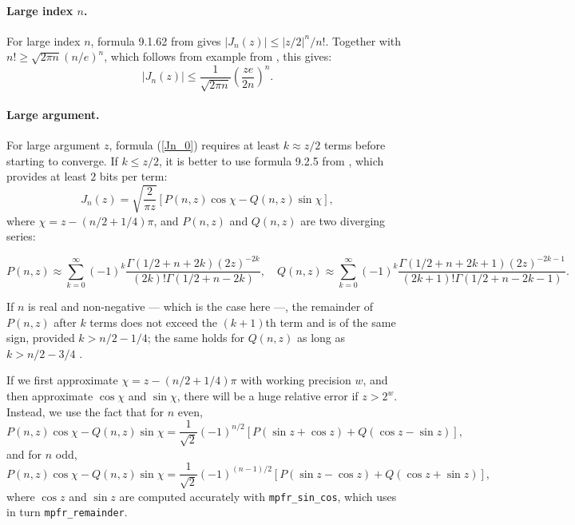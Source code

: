 \documentclass[12pt]{amsart}
\begin{document}
\paragraph{Large index $n$.}
For large index $n$, formula 9.1.62 from \cite{AbSt73} gives
$|J_n(z)| \leq |z/2|^n/n!$.
Together with $n! \geq \sqrt{2 \pi n} (n/e)^n$, which follows from example
from \cite[Eq.~6.1.38]{AbSt73}, this gives:
\[ |J_n(z)| \leq \frac{1}{\sqrt{2 \pi n}} \left( \frac{ze}{2n} \right)^n. \]

\paragraph{Large argument.}

For large argument $z$, formula (\ref{Jn_0}) requires at least
$k \approx z/2$ terms before starting to converge. If $k \leq z/2$, it is
better to use formula 9.2.5 from \cite{AbSt73}, which
provides at least $2$ bits per term:
\[ J_n(z) = \sqrt{\frac{2}{\pi z}} [P(n,z) \cos \chi - Q(n,z) \sin \chi], \]
where $\chi = z - (n/2 + 1/4) \pi$, and $P(n,z)$ and $Q(n,z)$ are two
diverging series:
\begin{small}
\[ P(n,z) \approx \sum_{k=0}^{\infty} (-1)^k \frac{\Gamma(1/2+n+2k) (2z)^{-2k}}
   {(2k)! \Gamma(1/2+n-2k)}, \quad
   Q(n,z) \approx \sum_{k=0}^{\infty} (-1)^k \frac{\Gamma(1/2+n+2k+1) (2z)^{-2k-1}}
   {(2k+1)! \Gamma(1/2+n-2k-1)}. \]
\end{small}
If $n$ is real and non-negative --- which is the case here ---,
the remainder of $P(n,z)$ after $k$ terms does not exceed the $(k+1)$th term
and is of the same sign, provided $k > n/2 - 1/4$; the same holds for
$Q(n,z)$ as long as $k > n/2 - 3/4$ \cite[9.2.10]{AbSt73}.

If we first approximate $\chi = z - (n/2 + 1/4) \pi$ with working precision
$w$, and then approximate $\cos \chi$ and $\sin \chi$, there will be a huge
relative error if $z > 2^w$. Instead, we use the fact that for $n$ even,
\[ P(n,z) \cos \chi - Q(n,z) \sin \chi = \frac{1}{\sqrt{2}} (-1)^{n/2}
   [P (\sin z + \cos z) + Q (\cos z - \sin z)], \]
and for $n$ odd,
\[ P(n,z) \cos \chi - Q(n,z) \sin \chi = \frac{1}{\sqrt{2}} (-1)^{(n-1)/2}
   [P (\sin z - \cos z) + Q (\cos z + \sin z)], \]
where $\cos z$ and $\sin z$ are computed accurately with
\texttt{mpfr\_sin\_cos}, which uses in turn \texttt{mpfr\_remainder}.
\end{document}
